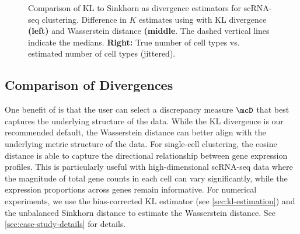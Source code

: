 \begin{figure}[t]
	\centering

	\caption{Comparison of KL to Sinkhorn as divergence estimators for scRNA-seq clustering. Difference in $K$ estimates using \methodname with KL divergence \textbf{(left)} 
    and Wasserstein distance \textbf{(middle}.
    The dashed vertical lines indicate the medians.
	\textbf{Right:} True number of cell types vs. estimated number of cell types (jittered).
	}
	\label{fig:sh_kl_comp}
\end{figure}

\subsection{Comparison of Divergences}

One benefit of \methodname is that the user can select a discrepancy measure $\mcD$ 
that best captures the underlying structure of the data.
While the KL divergence is our recommended default,
the Wasserstein distance can better align with the underlying metric structure of the data.
For single-cell clustering, the cosine distance is able to capture the directional relationship between gene expression profiles.
This is particularly useful with high-dimensional scRNA-seq data where the magnitude of total gene counts in each cell can vary
significantly, while the expression proportions across genes remain informative. %
%
For numerical experiments, we use the bias-corrected KL estimator (see \cref{sec:kl-estimation}) and the unbalanced Sinkhorn distance to estimate the Wasserstein distance.
See \cref{sec:case-study-details} for details.
%
%

